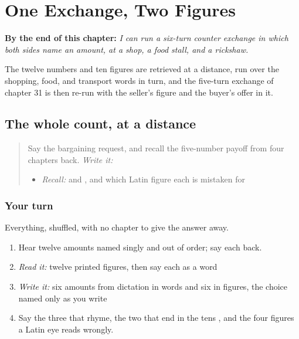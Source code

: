 
\chapter{One Exchange, Two Figures}
\label{ch:mw-numbered-exchange}

\begin{chapteropening}
\textbf{By the end of this chapter:} \emph{I can run a six-turn counter exchange in which both sides name an amount, at a shop, a food stall, and a rickshaw.}

The twelve numbers and ten figures are retrieved at a distance, run over the shopping, food, and transport words in turn, and the five-turn exchange of chapter 31 is then re-run with the seller's figure and the buyer's offer in it.
\end{chapteropening}

\section[Practice]{The whole count, at a distance}

\label{lesson:MW-R36-count-at-distance}



\begin{quote}
Say the bargaining request, and recall the five-number payoff from four chapters back. \emph{Write it:} \textbf{}

\begin{itemize}
\raggedright
  \item \emph{Recall:} \textbf{} and \textbf{}, and which Latin figure each is mistaken for
\end{itemize}
\end{quote}

\subsection*{Your turn}
Everything, shuffled, with no chapter to give the answer away.

\begin{enumerate}
\raggedright
  \item Hear twelve amounts named singly and out of order; say each back.
  \item \emph{Read it:} twelve printed figures, then say each as a word
  \item \emph{Write it:} six amounts from dictation in words and six in figures, the choice named only as you write
  \item Say the three that rhyme, the two that end in the tens \textbf{}, and the four figures a Latin eye reads wrongly.
\end{enumerate}

